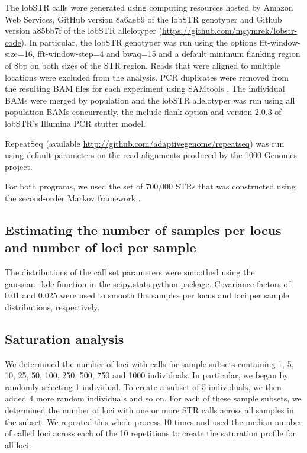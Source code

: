 The lobSTR calls were generated using computing resources hosted by Amazon Web Services, GitHub version 8a6aeb9 of the lobSTR genotyper and Github version a85bb7f of the lobSTR allelotyper (\url{https://github.com/mgymrek/lobstr-code}). In particular, the lobSTR genotyper was run using the options fft-window-size=16, fft-window-step=4 and bwaq=15 and a default minimum flanking region of 8bp on both sizes of the STR region. Reads that were aligned to multiple locations were excluded from the analysis. PCR duplicates were removed from the resulting BAM files for each experiment using SAMtools \cite{LiHandsakerWysokerEtAl2009}. The individual BAMs were merged by population and the lobSTR allelotyper was run using all population BAMs concurrently, the include-flank option and version 2.0.3 of lobSTR's Illumina PCR stutter model.  

RepeatSeq (available \url{http://github.com/adaptivegenome/repeatseq}) was run using default parameters on the read alignments produced by the 1000 Genomes project. 

For both programs, we used the set of 700,000 STRs that was constructed using the second-order Markov framework \cite{SuppWillemsGymrekHighnamEtAl2014}. 

\subsection{Estimating the number of samples per locus and number of loci per sample}
The distributions of the call set parameters were smoothed using the gaussian\_kde function in the scipy.stats python package. Covariance factors of 0.01 and 0.025 were used to smooth the samples per locus and loci per sample distributions, respectively. 

\subsection{Saturation analysis}
We determined the number of loci with calls for sample subsets containing 1, 5, 10, 25, 50, 100, 250, 500, 750 and 1000 individuals. In particular, we began by randomly selecting 1 individual. To create a subset of 5 individuals, we then added 4 more random individuals and so on. For each of these sample subsets, we determined the number of loci with one or more STR calls across all samples in the subset. We repeated this whole process 10 times and used the median number of called loci across each of the 10 repetitions to create the saturation profile for all loci. 

